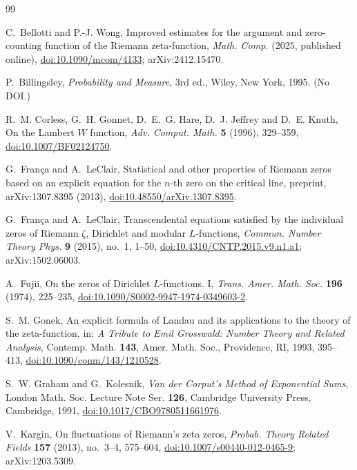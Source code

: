 \documentclass[11pt,reqno]{amsart}
\numberwithin{equation}{section}
\theoremstyle{plain}
\theoremstyle{definition}
\theoremstyle{remark}
\begin{document}
\begin{thebibliography}{99}

C.~Bellotti and P.-J. Wong, Improved estimates for the argument and zero-counting function of the Riemann zeta-function, \emph{Math. Comp.} (2025, published online), \href{https://doi.org/10.1090/mcom/4133}{doi:10.1090/mcom/4133}; arXiv:2412.15470.

P.~Billingsley, \emph{Probability and Measure}, 3rd ed., Wiley, New York, 1995. (No DOI.)

R.~M. Corless, G.~H. Gonnet, D.~E.~G. Hare, D.~J. Jeffrey and D.~E. Knuth, On the Lambert $W$ function, \emph{Adv. Comput. Math.} \textbf{5} (1996), 329--359, \href{https://doi.org/10.1007/BF02124750}{doi:10.1007/BF02124750}.

G.~Fran\c{c}a and A.~LeClair, Statistical and other properties of Riemann zeros based on an explicit equation for the $n$-th zero on the critical line, preprint, arXiv:1307.8395 (2013), \href{https://doi.org/10.48550/arXiv.1307.8395}{doi:10.48550/arXiv.1307.8395}.

G.~Fran\c{c}a and A.~LeClair, Transcendental equations satisfied by the individual zeros of Riemann $\zeta$, Dirichlet and modular $L$-functions, \emph{Commun. Number Theory Phys.} \textbf{9} (2015), no.~1, 1--50, \href{https://doi.org/10.4310/CNTP.2015.v9.n1.a1}{doi:10.4310/CNTP.2015.v9.n1.a1}; arXiv:1502.06003.

A.~Fujii, On the zeros of Dirichlet $L$-functions. I, \emph{Trans. Amer. Math. Soc.} \textbf{196} (1974), 225--235, \href{https://doi.org/10.1090/S0002-9947-1974-0349603-2}{doi:10.1090/S0002-9947-1974-0349603-2}.

S.~M. Gonek, An explicit formula of Landau and its applications to the theory of the zeta-function, in: \emph{A Tribute to Emil Grosswald: Number Theory and Related Analysis}, Contemp. Math. \textbf{143}, Amer. Math. Soc., Providence, RI, 1993, 395--413, \href{https://doi.org/10.1090/conm/143/1210528}{doi:10.1090/conm/143/1210528}.

S.~W. Graham and G.~Kolesnik, \emph{Van der Corput's Method of Exponential Sums}, London Math. Soc. Lecture Note Ser. \textbf{126}, Cambridge University Press, Cambridge, 1991, \href{https://doi.org/10.1017/CBO9780511661976}{doi:10.1017/CBO9780511661976}.

V.~Kargin, On fluctuations of Riemann's zeta zeros, \emph{Probab. Theory Related Fields} \textbf{157} (2013), no.~3--4, 575--604, \href{https://doi.org/10.1007/s00440-012-0465-9}{doi:10.1007/s00440-012-0465-9}; arXiv:1203.5309.


\end{thebibliography}
\end{document}
